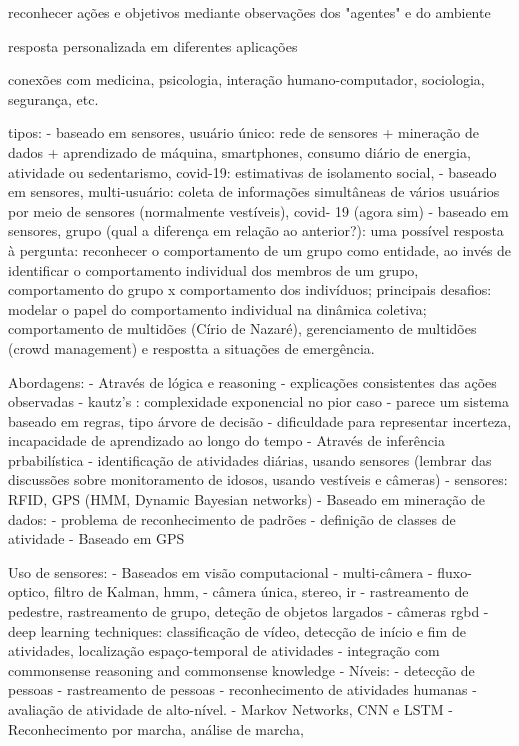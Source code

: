 reconhecer ações e objetivos
mediante observações dos "agentes" e do ambiente

resposta personalizada em diferentes aplicações

conexões com medicina, psicologia, interação humano-computador, sociologia, segurança, etc.

tipos:
  - baseado em sensores, usuário único: rede de sensores + mineração de dados + aprendizado de máquina, smartphones, consumo diário de energia, atividade ou sedentarismo, covid-19: estimativas de isolamento social,
  - baseado em sensores, multi-usuário: coleta de informações simultâneas de vários usuários por meio de sensores (normalmente vestíveis), covid- 19 (agora sim)
  - baseado em sensores, grupo (qual a diferença em relação ao anterior?): uma possível resposta à pergunta: reconhecer o comportamento de um grupo como entidade, ao invés de identificar o comportamento individual dos membros de um grupo, comportamento do grupo x comportamento dos indivíduos; principais desafios: modelar o papel do comportamento individual na dinâmica coletiva; comportamento de multidões (Círio de Nazaré), gerenciamento de multidões (crowd management) e respostta a situações de emergência.

Abordagens:
  - Através de lógica e reasoning
    - explicações consistentes das ações observadas
    - kautz's : complexidade exponencial no pior caso
    - parece um sistema baseado em regras, tipo árvore de decisão
    - dificuldade para representar incerteza, incapacidade de aprendizado ao longo do tempo
  - Através de inferência prbabilística
    - identificação de atividades diárias, usando sensores (lembrar das discussões sobre monitoramento de idosos, usando vestíveis e câmeras)
    - sensores: RFID, GPS (HMM, Dynamic Bayesian networks)
  - Baseado em mineração de dados:
    - problema de reconhecimento de padrões
    - definição de classes de atividade
  - Baseado em GPS

Uso de sensores:
  - Baseados em visão computacional
    - multi-câmera
    - fluxo-optico, filtro de Kalman, hmm, 
    - câmera única, stereo, ir
    - rastreamento de pedestre, rastreamento de grupo, deteção de objetos largados
    - câmeras rgbd
    - deep learning techniques: classificação de vídeo, detecção de início e fim de atividades, localização espaço-temporal de atividades
    - integração com commonsense reasoning and commonsense knowledge
    - Níveis:
      - detecção de pessoas
      - rastreamento de pessoas
      - reconhecimento de atividades humanas
      - avaliação de atividade de alto-nível.
    - Markov Networks, CNN e LSTM
    - Reconhecimento por marcha, análise de marcha,

